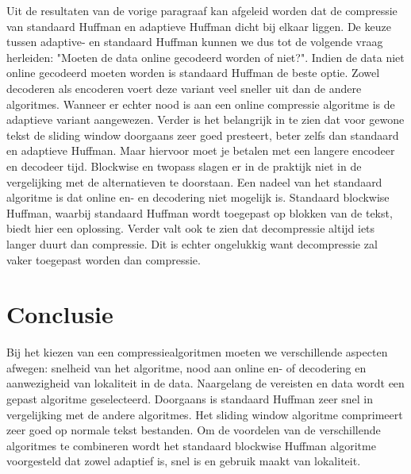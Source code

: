 \documentclass[twoside,twocolumn]{article}
\begin{document}
Uit de resultaten van de vorige paragraaf kan afgeleid worden dat de compressie van standaard Huffman en adaptieve Huffman dicht bij elkaar liggen. De keuze tussen adaptive- en standaard Huffman kunnen we dus tot de volgende vraag herleiden: "Moeten de data online gecodeerd worden of niet?". Indien de data niet online gecodeerd moeten worden is standaard Huffman de beste optie. Zowel decoderen als encoderen voert deze variant veel sneller uit dan de andere algoritmes. Wanneer er echter nood is aan een online compressie algoritme is de adaptieve variant aangewezen. Verder is het belangrijk in te zien dat voor gewone tekst de sliding window doorgaans zeer goed presteert, beter zelfs dan standaard en adaptieve Huffman. Maar hiervoor moet je betalen met een langere encodeer en decodeer tijd. Blockwise en twopass slagen er in de praktijk niet in de vergelijking met de alternatieven te doorstaan. Een nadeel van het standaard algoritme is dat online en- en decodering niet mogelijk is. Standaard blockwise Huffman, waarbij standaard Huffman wordt toegepast op blokken van de tekst, biedt hier een oplossing. 
Verder valt ook te zien dat decompressie altijd iets langer duurt dan compressie. Dit is echter ongelukkig want decompressie zal vaker toegepast worden dan compressie.

 

\section{Conclusie}
Bij het kiezen van een compressiealgoritmen moeten we verschillende aspecten afwegen: snelheid van het algoritme, nood aan online en- of decodering en aanwezigheid van lokaliteit in de data. Naargelang de vereisten en data wordt een gepast algoritme geselecteerd. Doorgaans is standaard Huffman zeer snel in vergelijking met de andere algoritmes. Het sliding window algoritme comprimeert zeer goed op normale tekst bestanden. Om de voordelen van de verschillende algoritmes te combineren wordt het standaard blockwise Huffman algoritme voorgesteld dat zowel adaptief is, snel is en gebruik maakt van lokaliteit. 


\printbibliography
\end{document}
